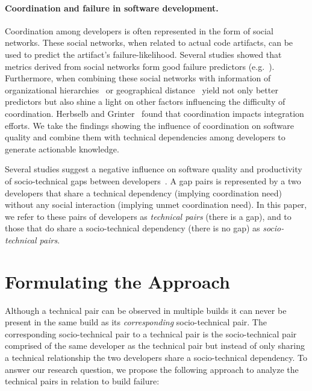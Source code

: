 \documentclass[conference]{IEEEtran}
\begin{document}
\paragraph{Coordination and failure in software development.}
Coordination among developers is often represented in the form of social networks.
These social networks, when related to actual code artifacts, can be used to predict the artifact's failure-likelihood.
Several studies showed that metrics derived from social networks form good failure predictors (e.g.~\cite{meneely:fse:2008}).
Furthermore, when combining these social networks with information of organizational hierarchies~\cite{nagappan:icse:2008} or geographical distance~\cite{bird:acm:2009} yield not only better predictors but also shine a light on other factors influencing the difficulty of coordination.
Herbselb and Grinter~\cite{herbsleb:icse:1999} found that coordination impacts integration efforts.
We take the findings showing the influence of coordination on software quality and combine them with technical dependencies among developers to generate actionable knowledge.

Several studies suggest a negative influence on software quality and productivity of socio-technical gaps between developers~\cite{valetto:msr:2007,kwan:tse:2011}.
A gap pairs is represented by a two developers that share a technical dependency (implying coordination need) without any social interaction (implying
unmet coordination need).
In this paper, we refer to these pairs of developers as \emph{technical pairs} (there is a gap), and to those that do
share a socio-technical dependency (there is no gap) as \emph{socio-technical pairs}.

\section{Formulating the Approach}
Although a technical pair can be observed in multiple builds it can never be present in the same build as its \emph{corresponding} socio-technical pair.
The corresponding socio-technical pair to a technical pair is the socio-technical pair comprised of the same developer as the technical pair but instead of only sharing a technical relationship the two developers share a socio-technical dependency.
To answer our research question, we propose the following approach to analyze the technical pairs in relation to build failure:
\end{document}
